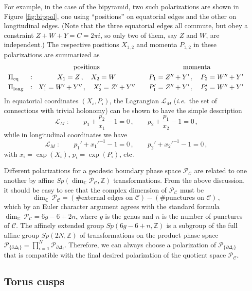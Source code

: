 \documentclass[hyper,letterpaper]{JHEP3}
\numberwithin{equation}{section}
\newcommand{\be}{\begin{equation}}
\newcommand{\ee}{\end{equation}}
\newcommand{\ie}{\emph{i.e.}}
\newcommand{\Z}{{\mathbb Z}}
\newcommand{\C}{{\mathbb C}}
\newcommand{\pd}{\partial}
\newcommand{\CC}{\mathcal{C}}
\newcommand{\CL}{\mathcal{L}}
\newcommand{\CP}{\mathcal{P}}
\begin{document}
For example, in the case of the bipyramid, two such polarizations are shown in Figure \ref{fig:bippol}, one using ``positions'' on equatorial edges and the other on longitudinal edges. (Note that the three equatorial edges all commute, but obey a constraint $Z+W+Y=C=2\pi i$, so only two of them, say $Z$ and $W$, are independent.) The respective positions $X_{1,2}$ and momenta $P_{1,2}$ in these polarizations are summarized as
%
\be \label{bipcoord3}
 \begin{array}{lc@{\;\;}c@{\qquad}c}
  && \text{positions} & \text{momenta} \\[.1cm]
  \Pi_{\rm eq} &:\;& X_1 = Z\,,\quad X_2=W & P_1 = Z''+Y'\,,\quad P_2 = W''+Y'\,\\[.1cm]
  \Pi_{\rm long} &:\;& X_1'=W'+Y''\,,\quad X_2' =Z'+Y'' & P_1' =Z''+Y'\,,\quad P_2' = W''+Y'\,
\end{array}
\ee
%
In equatorial coordinates $(X_i,P_i)$, the Lagrangian $\CL_M$ (\ie\ the set of connections with trivial holonomy) can be shown to have the simple description
%
\be \CL_M\;:\qquad p_1+\frac{p_2}{x_1}-1=0\,,\qquad p_2+\frac{p_1}{x_2}-1=0\,, \label{Lbipeq} \ee
%
while in longitudinal coordinates we have
%
\be \CL_M\;:\qquad p_1'+x_1'^{-1}-1=0\,,\qquad p_2'+x_2'^{-1}-1=0\,,\ee
%
with $x_i=\exp(X_i)$, $p_i=\exp(P_i)$, etc.


Different polarizations for a geodesic boundary phase space $\CP_\CC$ are related to one another by affine $Sp(\dim_\C \CP_\CC,\Z)$ transformations. From the above discussion, it should be easy to see that the complex dimension of $\CP_\CC$ must be
%
\be \dim_\C\,\CP_\CC = (\text{\# external edges on $\CC$})-(\text{\# punctures on $\CC$})\,,
\ee
%
which by an Euler character argument agrees with the standard formula $\dim_\C\,\CP_\CC = 6g-6+2n$, where $g$ is the genus and $n$ is the number of punctures of $\CC$. The affinely extended group $Sp(6g-6+n,\Z)$ is a subgroup of the full affine group $Sp(2N,\Z)$ of transformations on the product phase space $\CP_{\{\pd\Delta_i\}}=\prod_{i=1}^N\CP_{\pd\Delta_i}$. Therefore, we can always choose a polarization of $\CP_{\{\pd\Delta_i\}}$ that is compatible with the final desired polarization of the quotient space $\CP_\CC$.






\subsection{Torus cusps}
\label{sec:cuspbdy}
\end{document}
